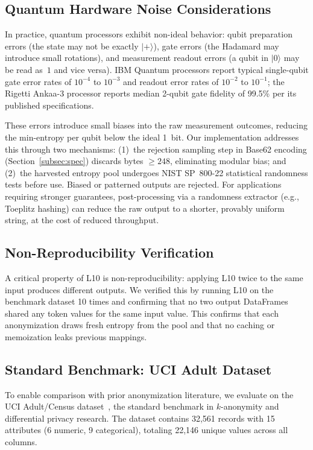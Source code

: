 \documentclass[journal]{IEEEtran}
\begin{document}
\subsection{Quantum Hardware Noise Considerations}

In practice, quantum processors exhibit non-ideal behavior: qubit preparation errors (the state may not be exactly $|{+}\rangle$), gate errors (the Hadamard may introduce small rotations), and measurement readout errors (a qubit in $|0\rangle$ may be read as~$1$ and vice versa). IBM Quantum processors report typical single-qubit gate error rates of $10^{-4}$ to $10^{-3}$ and readout error rates of $10^{-2}$ to $10^{-1}$; the Rigetti Ankaa-3 processor reports median 2-qubit gate fidelity of 99.5\% per its published specifications.

These errors introduce small biases into the raw measurement outcomes, reducing the min-entropy per qubit below the ideal 1~bit. Our implementation addresses this through two mechanisms: (1)~the rejection sampling step in Base62 encoding (Section~\ref{subsec:spec}) discards bytes $\geq 248$, eliminating modular bias; and (2)~the harvested entropy pool undergoes NIST SP~800-22 statistical randomness tests before use. Biased or patterned outputs are rejected. For applications requiring stronger guarantees, post-processing via a randomness extractor (e.g., Toeplitz hashing) can reduce the raw output to a shorter, provably uniform string, at the cost of reduced throughput.

\subsection{Non-Reproducibility Verification}

A critical property of L10 is non-reproducibility: applying L10 twice to the same input produces different outputs. We verified this by running L10 on the benchmark dataset 10 times and confirming that no two output DataFrames shared any token values for the same input value. This confirms that each anonymization draws fresh entropy from the pool and that no caching or memoization leaks previous mappings.

\subsection{Standard Benchmark: UCI Adult Dataset}

To enable comparison with prior anonymization literature, we evaluate on the UCI Adult/Census dataset~\cite{dua2019uci}, the standard benchmark in $k$-anonymity and differential privacy research. The dataset contains 32,561 records with 15 attributes (6 numeric, 9 categorical), totaling 22,146 unique values across all columns.
\end{document}
